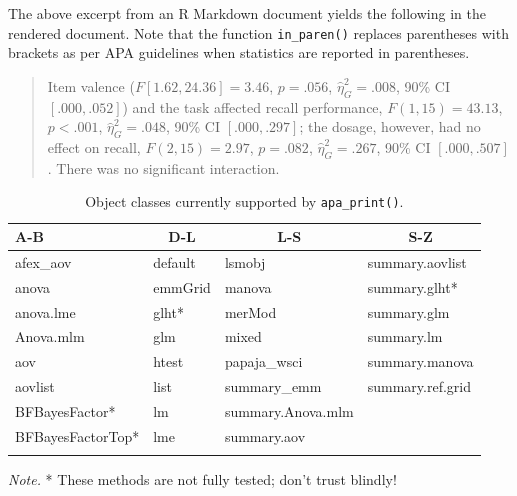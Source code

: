 \documentclass[
  ,man,floatsintext]{apa6}
\begin{document}
The above excerpt from an R Markdown document yields the following in the rendered document.
Note that the function \texttt{in\_paren()} replaces parentheses with brackets as per APA guidelines when statistics are reported in parentheses.

\begin{quote}
Item valence (\(F[1.62, 24.36] = 3.46\), \(p = .056\), \(\hat{\eta}^2_G = .008\), 90\% CI \([.000, .052]\)) and the task affected recall performance, \(F(1, 15) = 43.13\), \(p < .001\), \(\hat{\eta}^2_G = .048\), 90\% CI \([.000, .297]\); the dosage, however, had no effect on recall, \(F(2, 15) = 2.97\), \(p = .082\), \(\hat{\eta}^2_G = .267\), 90\% CI \([.000, .507]\).
There was no significant interaction.
\end{quote}



\begin{table}[tbp]

\begin{center}
\begin{threeparttable}

\caption{\label{tab:apa-print-methods}Object classes currently supported by \texttt{apa\_print()}.}

\begin{tabular}{llll}
\toprule
A-B & \multicolumn{1}{c}{D-L} & \multicolumn{1}{c}{L-S} & \multicolumn{1}{c}{S-Z}\\
\midrule
afex\_aov & default & lsmobj & summary.aovlist\\
anova & emmGrid & manova & summary.glht*\\
anova.lme & glht* & merMod & summary.glm\\
Anova.mlm & glm & mixed & summary.lm\\
aov & htest & papaja\_wsci & summary.manova\\
aovlist & list & summary\_emm & summary.ref.grid\\
BFBayesFactor* & lm & summary.Anova.mlm & \\
BFBayesFactorTop* & lme & summary.aov & \\
\bottomrule
\addlinespace
\end{tabular}

\begin{tablenotes}[para]
\normalsize{\textit{Note.} * These methods are not fully tested; don't trust blindly!}
\end{tablenotes}

\end{threeparttable}
\end{center}

\end{table}
\end{document}
